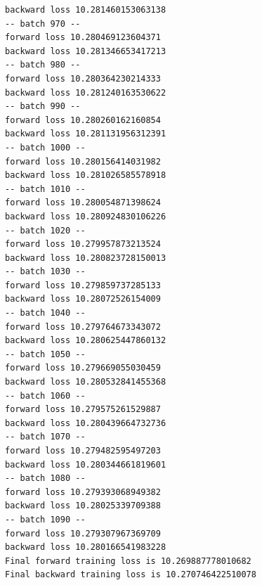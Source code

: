 \documentclass[11pt]{article}
\begin{document}
\begin{Verbatim}[commandchars=\\\{\}]
backward loss 10.281460153063138
-- batch 970 --
forward loss 10.280469123604371
backward loss 10.281346653417213
-- batch 980 --
forward loss 10.280364230214333
backward loss 10.281240163530622
-- batch 990 --
forward loss 10.280260162160854
backward loss 10.281131956312391
-- batch 1000 --
forward loss 10.280156414031982
backward loss 10.281026585578918
-- batch 1010 --
forward loss 10.280054871398624
backward loss 10.280924830106226
-- batch 1020 --
forward loss 10.279957873213524
backward loss 10.280823728150013
-- batch 1030 --
forward loss 10.279859737285133
backward loss 10.28072526154009
-- batch 1040 --
forward loss 10.279764673343072
backward loss 10.280625447860132
-- batch 1050 --
forward loss 10.279669055030459
backward loss 10.280532841455368
-- batch 1060 --
forward loss 10.279575261529887
backward loss 10.280439664732736
-- batch 1070 --
forward loss 10.279482595497203
backward loss 10.280344661819601
-- batch 1080 --
forward loss 10.279393068949382
backward loss 10.28025339709388
-- batch 1090 --
forward loss 10.279307967369709
backward loss 10.280166541983228
Final forward training loss is 10.269887778010682
Final backward training loss is 10.270746422510078

    \end{Verbatim}
\end{document}
